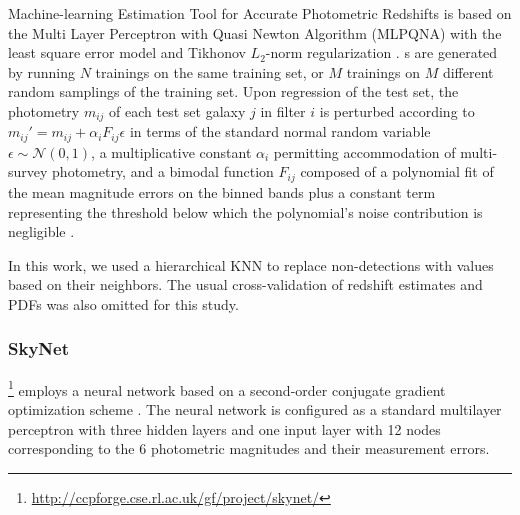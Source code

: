Machine-learning Estimation Tool for Accurate Photometric Redshifts \citep[\metaphor\footnote{\url{http://dame.dsf.unina.it}},][]{cavuoti_metaphor:_2017} is based on the Multi Layer Perceptron with Quasi Newton Algorithm (MLPQNA) with the least square error model and Tikhonov $L_{2}$-norm regularization \citep{hofmann_tikhonov_2018}.
\Pzpdf s are generated by running $N$ trainings on the same training set, or $M$ trainings on $M$ different random samplings of the training set.
Upon regression of the test set, the photometry $m_{ij}$ of each test set galaxy $j$ in filter $i$ is perturbed according to $m_{ij}' = m_{ij} + \alpha_{i} F_{ij} \epsilon$ in terms of the standard normal random variable $\epsilon \sim \mathcal{N}(0, 1)$, a multiplicative constant $\alpha_{i}$ permitting accommodation of multi-survey photometry, and a bimodal function $F_{ij}$ composed of a polynomial fit of the mean magnitude errors on the binned bands plus a constant term representing the threshold below which the polynomial's noise contribution is negligible \citep{brescia_data_2018}.

In this work, we used a hierarchical KNN to replace non-detections with values based on their neighbors.
The usual cross-validation of redshift estimates and PDFs was also omitted for this study.

\subsubsection{SkyNet}

\skynet \footnote{\url{http://ccpforge.cse.rl.ac.uk/gf/project/skynet/}} \citep{graff_skynet:_2014} employs a neural network based on a second-order conjugate gradient optimization scheme \citep[see][for further details]{graff_skynet:_2014}. %
The neural network is configured as a standard multilayer perceptron with three hidden layers and one input layer with 12 nodes corresponding to the 6 photometric magnitudes and their measurement errors.

